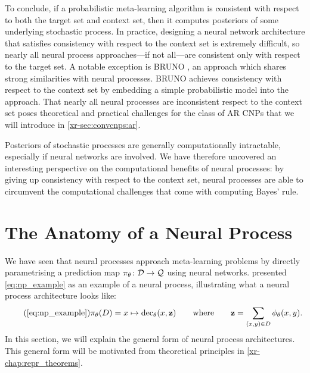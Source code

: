 \documentclass[12pt, twoside]{report}
\newcommand{\xrprefix}[1]{xr-#1}
\begin{document}
To conclude, if a probabilistic meta-learning algorithm is consistent with respect to both the target set and context set,
then it computes posteriors of some underlying stochastic process.
In practice, designing a neural network architecture that satisfies consistency with respect to the context set is extremely difficult, so nearly all neural process approaches---if not all---are consistent only with respect to the target set.
A notable exception is BRUNO \parencite{Korshunova:2018:BRUNO_A_Deep_Recurrent_Model,Korshunova:2020:Conditional_BRUNO_A_Neural_Process}, an approach which shares strong similarities with neural processes.
BRUNO achieves consistency with respect to the context set by embedding a simple probabilistic model into the approach.
That nearly all neural processes are inconsistent respect to the context set
poses theoretical and practical challenges for the class of AR CNPs
that we will introduce in \cref{\xrprefix{sec:convcnps:ar}}.

Posteriors of stochastic processes are generally computationally intractable, especially if neural networks are involved.
We have therefore uncovered an interesting perspective on the computational benefits of neural processes:
by giving up consistency with respect to the context set, neural processes are able to circumvent the 
 computational challenges that come with computing Bayes' rule.


\pagebreak
\section{The Anatomy of a Neural Process}
\label{sec:nps:anatomy}

We have seen that neural processes approach meta-learning problems by directly parametrising a prediction map $\pi_\theta \colon \mathcal{D} \to \mathcal{Q}$ using neural networks.
 presented \eqref{eq:np_example} as an example of a neural process, illustrating what a neural process architecture looks like:%
\begin{equation} \tag{\ref{eq:np_example}} \label{eq:np_example:duplicate}
    \pi_\theta(D) = x \mapsto \operatorname{dec}_\theta(x, \vz)
    \qquad \text{where} \qquad
    \vz = \sum_{(x, y) \in D} \phi_\theta(x, y).
\end{equation}
In this section, we will explain the general form of neural process architectures.
This general form will be motivated from theoretical principles in \cref{\xrprefix{chap:repr_theorems}}.
\end{document}
